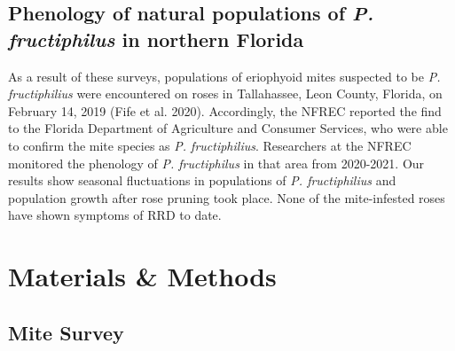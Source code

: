 \documentclass[12pt,final,CPage]{ufthesis}
\begin{document}
{{  \subsection{\texorpdfstring{Phenology of natural populations of \emph{P. fructiphilus} in northern Florida}{Phenology of natural populations of P. fructiphilus in northern Florida}}\label{intro-pheno}}

  As a result of these surveys, populations of eriophyoid mites suspected to be \emph{P. fructiphilius} were encountered on roses in Tallahassee, Leon County, Florida, on February 14, 2019 (Fife et al. 2020). Accordingly, the NFREC reported the find to the Florida Department of Agriculture and Consumer Services, who were able to confirm the mite species as \emph{P. fructiphilius}. Researchers at the NFREC monitored the phenology of \emph{P. fructiphilus} in that area from 2020-2021. Our results show seasonal fluctuations in populations of \emph{P. fructiphilius} and population growth after rose pruning took place. None of the mite-infested roses have shown symptoms of RRD to date.

  \hypertarget{materials-methods}{%
  \section{Materials \& Methods}\label{materials-methods}}

  \hypertarget{mm-survey}{%
  \subsection{Mite Survey}\label{mm-survey}}

}
\end{document}
